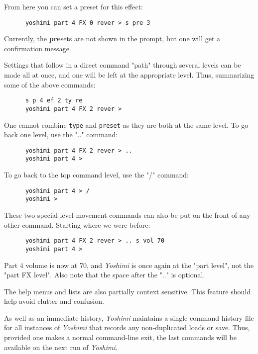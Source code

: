    From here you can set a preset for this effect:

   \begin{verbatim}
      yoshimi part 4 FX 0 rever > s pre 3
   \end{verbatim}

   Currently, the \textbf{pre}sets are not shown in the prompt, but one
   will get a confirmation message.

   Settings that follow in a direct command "path" through several levels
   can be made all at once, and one will be left at the appropriate level.
   Thus, summarizing some of the above commands:

   \begin{verbatim}
      s p 4 ef 2 ty re
      yoshimi part 4 FX 2 rever >
   \end{verbatim}

   One cannot combine \texttt{type} and \texttt{preset} as they
   are both at the same level.  To go back one level, use the
   ".." command:

   \begin{verbatim}
      yoshimi part 4 FX 2 rever > ..
      yoshimi part 4 >
   \end{verbatim}

   To go back to the top command level, use the "/" command:

   \begin{verbatim}
      yoshimi part 4 > /
      yoshimi >
   \end{verbatim}

   These two special level-movement commands can also be put on the front of
   any other command.  Starting where we were before:

   \begin{verbatim}
      yoshimi part 4 FX 2 rever > .. s vol 70
      yoshimi part 4 >
   \end{verbatim}

   Part 4 volume is now at 70, and \textsl{Yoshimi} is once again at the
   "part level", not the "part FX level".  Also note that the space after
   the ".." is optional.

   The help menus and lists are also partially context sensitive. This
   feature should help avoid clutter and confusion.

   As well as an immediate history, \textsl{Yoshimi} maintains a single command
   history file for all instances of \textsl{Yoshimi} that records any
   non-duplicated loads or save.  Thus, provided one makes a normal
   command-line exit, the last commands will be available on the next run of
   \textsl{Yoshimi}.

